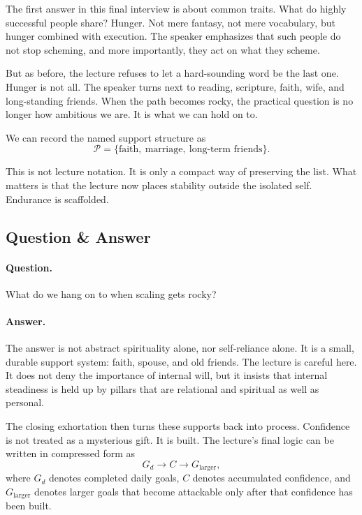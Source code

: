 The first answer in this final interview is about common traits. What do highly successful people share? Hunger. Not mere fantasy, not mere vocabulary, but hunger combined with execution. The speaker emphasizes that such people do not stop scheming, and more importantly, they act on what they scheme.

But as before, the lecture refuses to let a hard-sounding word be the last one. Hunger is not all. The speaker turns next to reading, scripture, faith, wife, and long-standing friends. When the path becomes rocky, the practical question is no longer how ambitious we are. It is what we can hold on to.

We can record the named support structure as
\begin{equation}
\mathcal{P}=\{\text{faith},\ \text{marriage},\ \text{long-term friends}\}.
\end{equation}

This is not lecture notation. It is only a compact way of preserving the list. What matters is that the lecture now places stability outside the isolated self. Endurance is scaffolded.

\subsection{Question \& Answer}

\paragraph{Question.}
What do we hang on to when scaling gets rocky?

\paragraph{Answer.}
The answer is not abstract spirituality alone, nor self-reliance alone. It is a small, durable support system: faith, spouse, and old friends. The lecture is careful here. It does not deny the importance of internal will, but it insists that internal steadiness is held up by pillars that are relational and spiritual as well as personal.

The closing exhortation then turns these supports back into process. Confidence is not treated as a mysterious gift. It is built. The lecture's final logic can be written in compressed form as
\begin{equation}
G_d \to C \to G_{\text{larger}},
\end{equation}
where \(G_d\) denotes completed daily goals, \(C\) denotes accumulated confidence, and \(G_{\text{larger}}\) denotes larger goals that become attackable only after that confidence has been built.

